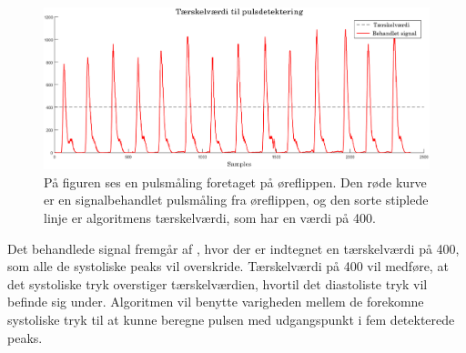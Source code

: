 \begin{figure}[H]
	\centering
	\includegraphics[scale=0.29]{figures/cDesign/puls_taerskel.png}
	\caption{På figuren ses en pulsmåling foretaget på øreflippen. Den røde kurve er en signalbehandlet pulsmåling fra øreflippen, og den sorte stiplede linje er algoritmens tærskelværdi, som har en værdi på 400.}
	\label{fig:taerskel_puls}
\end{figure}\vspace{-.25cm}
Det behandlede signal fremgår af , hvor der er indtegnet en tærskelværdi på 400, som alle de systoliske peaks vil overskride. Tærskelværdi på 400 vil medføre, at det systoliske tryk overstiger tærskelværdien, hvortil det diastoliste tryk vil befinde sig under. Algoritmen vil benytte varigheden mellem de forekomne systoliske tryk til at kunne beregne pulsen med udgangspunkt i fem detekterede peaks. 

